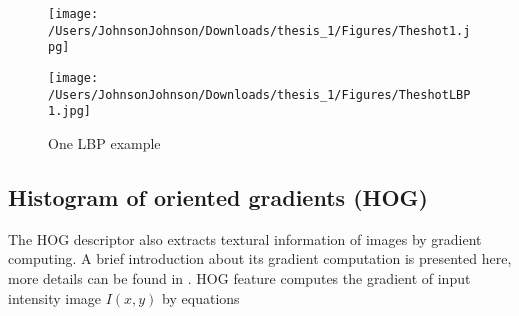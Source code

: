 \begin{figure}
\begin{minipage}[t]{0.5\linewidth}
\centering
\texttt{[image: /Users/JohnsonJohnson/Downloads/thesis\_1/Figures/Theshot1.jpg]}
\end{minipage}%
\begin{minipage}[t]{0.5\linewidth}
\centering
\texttt{[image: /Users/JohnsonJohnson/Downloads/thesis\_1/Figures/TheshotLBP1.jpg]}
\end{minipage}
\caption{One LBP example}
\label{LBPdemoshot}
\end{figure}


\subsection{Histogram of oriented gradients (HOG)}
The HOG \cite{HOG} descriptor also extracts textural information of images by gradient computing. A brief introduction about its gradient computation is presented here, more details can be found in \cite{HOG}. HOG feature computes the gradient of input intensity  image $I(x, y)$ by equations 

